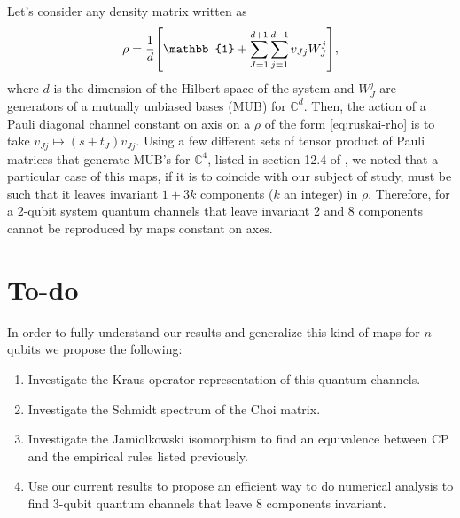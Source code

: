 \documentclass[11pt,dvipsnames]{article} %
\begin{document}
Let's consider any density matrix written as
\begin{align}
	\rho = \frac{1}{d}\qty[\mathbb{1} + \sum _{J=1}^{d+1} \sum _{j=1}^{d-1}
	v_{Jj}W_J^j],
	\label{eq:ruskai-rho}
\end{align}
where $d$ is the dimension of the Hilbert space of the system and $W_J^j$ 
are generators of a mutually unbiased bases (MUB) for $\mathbb{C}^{d}$. Then,
the action of a Pauli diagonal channel constant on axis on a $\rho$ of the form
\eqref{eq:ruskai-rho} is to take $v_{Jj}\mapsto (s+t_J)v_{Jj}$. Using a few
different sets of tensor product of Pauli matrices that generate MUB's for
$\mathbb{C}^4$, listed in section 12.4 of \cite{bengtsson_zyczkowski_2017}, 
we noted that a particular case of this maps, if it is to coincide with our subject of
study, must be such that it leaves invariant $1+3k$ components ($k$ an integer)
in $\rho$. Therefore, for a 2-qubit system quantum channels that leave 
invariant 2 and 8 components cannot be reproduced by maps constant on axes. 

\section*{To-do} %
In order to fully understand our results and generalize this kind of maps 
for $n$ qubits we propose the following:
\begin{enumerate}
\item Investigate the Kraus operator representation of this quantum channels.
\item Investigate the Schmidt spectrum of the Choi matrix.
\item Investigate the Jamiolkowski isomorphism to find an equivalence between
CP and the empirical rules listed previously.
\item Use our current results to propose an efficient way to do numerical
analysis to find 3-qubit quantum channels that leave 8 components invariant.
\end{enumerate}


\vfill
\end{document}
